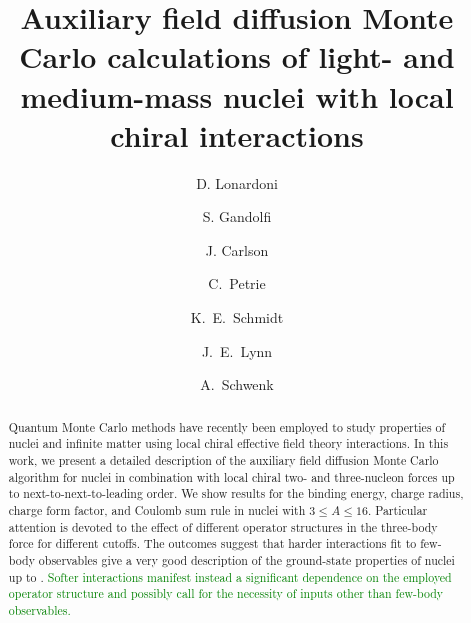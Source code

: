 \documentclass[aps,prc,twocolumn,superscriptaddress,floatfix]{revtex4-1}
\newcommand{\green}[1]{\protect\textcolor{green}{#1}}
\begin{document}
\title{Auxiliary field diffusion Monte Carlo calculations of light- and medium-mass nuclei with local chiral interactions}

\author{D. Lonardoni}

\author{S. Gandolfi}
\author{J. Carlson}

\author{C.~Petrie}
\author{K.~E.~Schmidt}

\author{J.~E.~Lynn}

\author{A.~Schwenk}


\begin{abstract}
Quantum Monte Carlo methods have recently been employed to study properties
of nuclei and infinite matter using local chiral effective field theory 
interactions. In this work, we present a detailed description of the
auxiliary field diffusion Monte Carlo algorithm for nuclei in combination 
with local chiral two- and three-nucleon forces up to 
next-to-next-to-leading order. We show results for the binding energy, 
charge radius, charge form factor, and Coulomb sum rule in nuclei with
$3\le A\le16$. Particular attention is devoted to the effect 
of different operator structures in the three-body force for different cutoffs. 
The outcomes suggest that harder interactions fit to few-body observables
give a very good description of the ground-state properties of nuclei up to
. \green{Softer interactions manifest instead a significant dependence 
on the employed operator structure and possibly call for the necessity of 
inputs other than few-body observables.}
\end{abstract}
\end{document}
